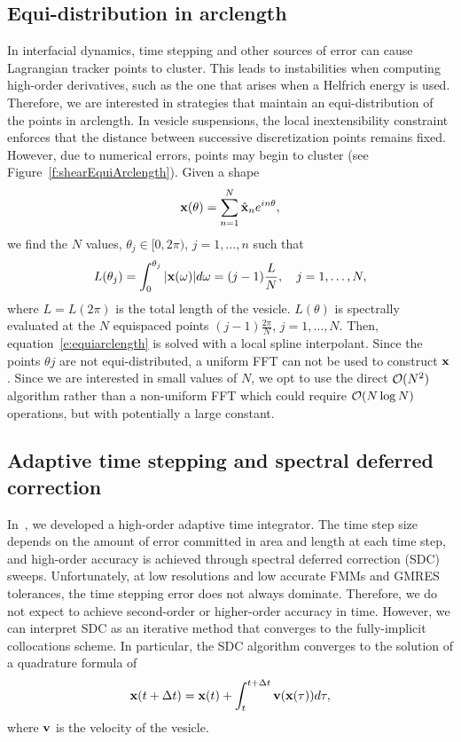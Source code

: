 \subsection{Equi-distribution in arclength}
In interfacial dynamics, time stepping and other sources of error can
cause Lagrangian tracker points to cluster.  This leads to instabilities
when computing high-order derivatives, such as the one that arises when
a Helfrich energy is used.  Therefore, we are interested in strategies
that maintain an equi-distribution of the points in arclength.  In
vesicle suspensions, the local inextensibility constraint enforces that
the distance between successive discretization points remains fixed.
However, due to numerical errors, points may begin to cluster (see
Figure~\ref{f:shearEquiArclength}).  Given a shape
\begin{align*}
  {\mathbf{x}}(\theta) = \sum_{n=1}^{N} \hat{{\mathbf{x}}}_{n} e^{in\theta},
\end{align*}
we find the $N$ values, $\theta_{j} \in [0,2\pi)$, $j=1,\ldots,n$ such
that
\begin{align}
  L(\theta_{j}) = \int_{0}^{\theta_{j}} |{\mathbf{x}}(\omega)| d\omega = 
    (j-1)\frac{L}{N}, \quad j=1,\ldots,N,
  \label{e:equiarclength}
\end{align}
where $L = L(2\pi)$ is the total length of the vesicle.  $L(\theta)$ is
spectrally evaluated at the $N$ equispaced points $(j-1)\frac{2\pi}{N}$,
$j=1,\ldots,N.$  Then, equation~\eqref{e:equiarclength} is solved with a
local spline interpolant.  Since the points $\theta{j}$ are not
equi-distributed, a uniform FFT can not be used to construct ${\mathbf{x}}$.
Since we are interested in small values of $N$, we opt to use the direct
$\mathcal{O}(N^{2})$ algorithm rather than a non-uniform FFT which could
require $\mathcal{O}(N\log N)$ operations, but with potentially a large
constant.


\subsection{Adaptive time stepping and spectral deferred correction}
In~\cite{qua:bir2014b, qua:bir2014c}, we developed a high-order adaptive
time integrator.  The time step size depends on the amount of error
committed in area and length at each time step, and high-order accuracy
is achieved through spectral deferred correction (SDC) sweeps.
Unfortunately, at low resolutions and low accurate FMMs and GMRES
tolerances, the time stepping error does not always dominate.
Therefore, we do not expect to achieve second-order or higher-order
accuracy in time.  However, we can interpret SDC as an iterative method
that converges to the fully-implicit collocations scheme.  In
particular, the SDC algorithm converges to the solution of a quadrature
formula of
\begin{align}
  {\mathbf{x}}(t+\Delta t) = {\mathbf{x}}(t) + \int_{t}^{t+\Delta t} {\mathbf{v}}({\mathbf{x}}(\tau)) d\tau,
  \label{e:picardFormulation}
\end{align}
where ${\mathbf{v}}$ is the velocity of the vesicle.

